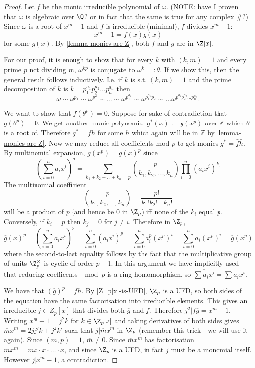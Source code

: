 \begin{proof}
Let $f$ be the monic irreducible polynomial of $\omega$. (NOTE: have I proven that $\omega$ is algebraic over $\Q$? or in fact that the same is true for any complex \#?) Since $\omega$ is a root of $x^m-1$ and $f$ is irreducible (minimal), $f$ divides $x^m-1$:
$$x^m-1=f(x)g(x)$$
for some $g(x)$. By \cref{lemma-monics-are-Z}, both $f$ and $g$ are in $\Z[x]$.

For our proof, it is enough to show that for every $k$ with $(k,m)=1$ and every prime $p$ not dividing $m$, $\omega^{kp}$ is conjugate to $\omega^k=:\theta$. If we show this, then the general result follows inductively. I.e. if $k$ is s.t. $(k,m)=1$ and the prime decomposition of $k$ is $k=p_1^{a_1}p_2^{a_2}\dots p_n^{a_n}$ then
$$\omega\sim\omega^{p_1}\sim\omega^{p_1^2}\sim\dots\sim\omega^{p_1^{a_1}}\sim\omega^{p_1^{a_1}p_2}\sim\dots \omega^{p_1^{a_1}p_2^{a_2}\dots p_n^{a_n}}.$$

We want to show that $f(\theta^p)=0$. Suppose for sake of contradiction that $g(\theta^p)=0$. We get another monic polynomial $g^*(x):=g(x^p)$ over $\mathbb{Z}$ which $\theta$ is a root of. Therefore $g^*=fh$ for some $h$ which again will be in $\mathbb{Z}$ by \cref{lemma-monics-are-Z}. Now we may reduce all coefficients mod $p$ to get monics $\overline{g^*}=\bar{f}\bar{h}$. By multinomial expansion, $\overline{g}(x^p)=\bar{g}(x)^p$ since $$(\sum_{i=0}^n a_ix^i)^p=\sum_{k_1+k_2+\dots+k_n=p}{p\choose k_1,k_2,\dots ,k_n}\prod_{i=0}^n(a_ix^i)^{k_i}$$
The multinomial coefficient $${p\choose k_1,k_2,\dots ,k_n}=\frac{p!}{k_1!k_2!\dots k_n!}$$
will be a product of $p$ (and hence be $0$ in $\Z_p$) iff none of the $k_i$ equal $p$. Conversely, if $k_i=p$ then $k_j=0$ for $j\neq i$. Therefore in $\Z_p$,
$$\overline{g}(x)^p=(\sum_{i=0}^n a_ix^i)^p=\sum_{i=0}^n(a_ix^i)^p=\sum_{i=0}^n a_i^p (x^p)^i=\sum_{i=0}^n a_i (x^p)^i=\overline{g}(x^p)$$
where the second-to-last equality follows by the fact that the multiplicative group of units $\Z_p^{\times}$ is cyclic of order $p-1$. In this argument we have implicitly used that reducing coefficents $\mod p$ is a ring homomorphism, so $\overline{\sum a_ix^i}=\sum \overline{a_i}x^i.$

We have that $(\overline{g})^p=\overline{f}\overline{h}$. By \cref{Z_p[x]-is-UFD}, $\Z_p$ is a UFD, so both sides of the equation have the same factorisation into irreducible elements. This gives an irreducible $j\in Z_p[x]$ that divides both $\overline{g}$ and $\overline{f}$. Therefore $j^2|\overline{f}\overline{g}=x^m-1$. Writing $x^m-1=j^2k$ for $k\in \Z_p[x]$ and taking derivatives of both sides gives $\overline{m}x^m=2jj'k+j^2k'$ such that $j|\overline{m}x^m$ in $\Z_p$ (remember this trick - we will use it again). Since $(m,p)=1$, $\overline{m}\neq 0$. Since $\overline{m}x^m$ has factorisation $\overline{m}x^m=\overline{m}x\cdot x\cdot \dots \cdot x$, and since $\Z_p$ is a UFD, in fact $j$ must be a monomial itself. However $j|x^m-1$, a contradiction.
\end{proof}

